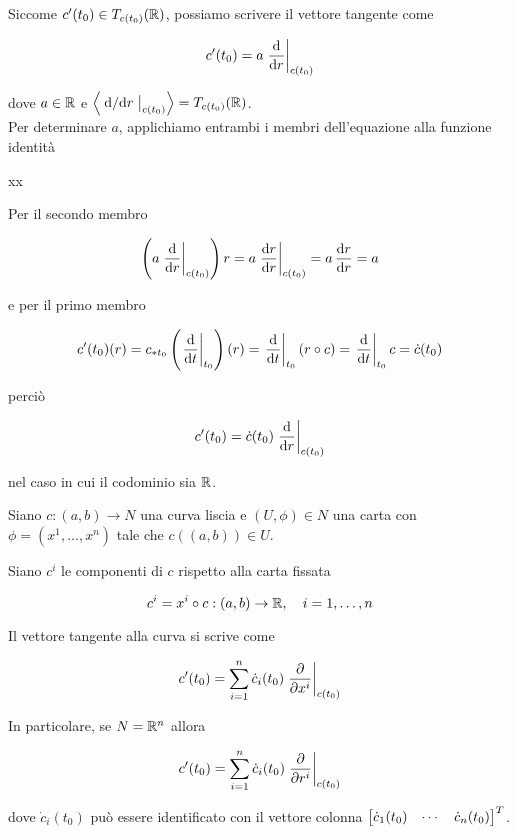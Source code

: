 Siccome $ c'(t_{0}) \in T_{c(t_{0})}(\mathbb{R}) $, possiamo scrivere il vettore tangente come

\begin{equation}
	c'(t_{0}) = a \eval{ \dv{r} }_{c(t_{0})}
\end{equation}

dove $ a \in \mathbb{R} $ e $ \ev{ \eval{ \dv*{r} }_{c(t_{0})} } = T_{c(t_{0})}(\R) $.\\
Per determinare $ a $, applichiamo entrambi i membri dell'equazione alla funzione identità

	{\R}{\R}
	{x}{x}

Per il secondo membro

\begin{equation}
	\left( a \eval{ \dv{r} }_{c(t_{0})} \right) r = a \eval{ \dv{r}{r} }_{c(t_{0})} %
	= a \, \dv{r}{r} %
	= a
\end{equation}

e per il primo membro

\begin{equation}
	c'(t_{0})(r) = c_{*t_{0}} \left( \eval{ \ddv{t} }_{t_{0}} \right)(r) %
	= \eval{ \ddv{t} }_{t_{0}} (r \circ c) %
	= \eval{ \ddv{t} }_{t_{0}} c %
	= \dot{c}(t_{0})
\end{equation}

perciò

\begin{equation}
	c'(t_{0}) = \dot{c}(t_{0}) \eval{ \dv{r} }_{c(t_{0})}
\end{equation}

nel caso in cui il codominio sia $ \mathbb{R} $.

\begin{definition}\label{loc-exp-tan-cur}
	Siano $ c : (a,b) \to N $ una curva liscia e $ (U,\phi) \in N $ una carta con $ \phi = (x^{1},\dots,x^{n}) $ tale che $ c((a,b)) \in U $.
	
	
	Siano $ c^{i} $ le componenti di $ c $ rispetto alla carta fissata
	
	\begin{equation}
		c^{i} = x^{i} \circ c : (a,b) \to \R \qcomma i=1,\dots,n
	\end{equation}
	
	Il vettore tangente alla curva si scrive come
	
	\begin{equation}
		c'(t_{0}) = \sum_{i=1}^{n} \dot{c}_{i}(t_{0}) \eval{ \pdv{x^{i}} }_{c(t_{0})}
	\end{equation}

	In particolare, se $ N = \mathbb{R}^{n} $ allora
	
	\begin{equation}
		c'(t_{0}) = \sum_{i=1}^{n} \dot{c}_{i}(t_{0}) \eval{ \pdv{r^{i}} }_{c(t_{0})}
	\end{equation}

	dove $ \dot{c}_{i}(t_{0}) $ può essere identificato con il vettore colonna $ \bmqty{ \dot{c}_{1}(t_{0}) & \cdots & \dot{c}_{n}(t_{0}) }^{T} $.
\end{definition}

